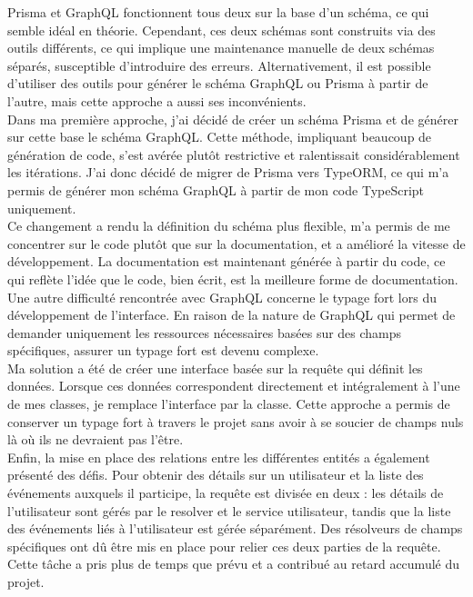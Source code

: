 Prisma et GraphQL fonctionnent tous deux sur la base d'un schéma, ce qui semble idéal en théorie.
Cependant, ces deux schémas sont construits via des outils différents, ce qui implique une maintenance manuelle de deux schémas séparés, susceptible d'introduire des erreurs.
Alternativement, il est possible d'utiliser des outils pour générer le schéma GraphQL ou Prisma à partir de l'autre, mais cette approche a aussi ses inconvénients.\\

Dans ma première approche, j'ai décidé de créer un schéma Prisma et de générer sur cette base le schéma GraphQL. Cette méthode, impliquant beaucoup de génération de code, s'est avérée plutôt restrictive et ralentissait considérablement les itérations.
J'ai donc décidé de migrer de Prisma vers TypeORM, ce qui m'a permis de générer mon schéma GraphQL à partir de mon code TypeScript uniquement.\\

Ce changement a rendu la définition du schéma plus flexible, m'a permis de me concentrer sur le code plutôt que sur la documentation, et a amélioré la vitesse de développement.
La documentation est maintenant générée à partir du code, ce qui reflète l'idée que le code, bien écrit, est la meilleure forme de documentation.\\

Une autre difficulté rencontrée avec GraphQL concerne le typage fort lors du développement de l'interface.
En raison de la nature de GraphQL qui permet de demander uniquement les ressources nécessaires basées sur des champs spécifiques, assurer un typage fort est devenu complexe.\\

Ma solution a été de créer une interface basée sur la requête qui définit les données.
Lorsque ces données correspondent directement et intégralement à l'une de mes classes, je remplace l'interface par la classe.
Cette approche a permis de conserver un typage fort à travers le projet sans avoir à se soucier de champs nuls là où ils ne devraient pas l'être.\\

Enfin, la mise en place des relations entre les différentes entités a également présenté des défis.
Pour obtenir des détails sur un utilisateur et la liste des événements auxquels il participe, la requête est divisée en deux :
les détails de l'utilisateur sont gérés par le resolver et le service utilisateur, tandis que la liste des événements liés à l'utilisateur est gérée séparément.
Des résolveurs de champs spécifiques ont dû être mis en place pour relier ces deux parties de la requête.
Cette tâche a pris plus de temps que prévu et a contribué au retard accumulé du projet.